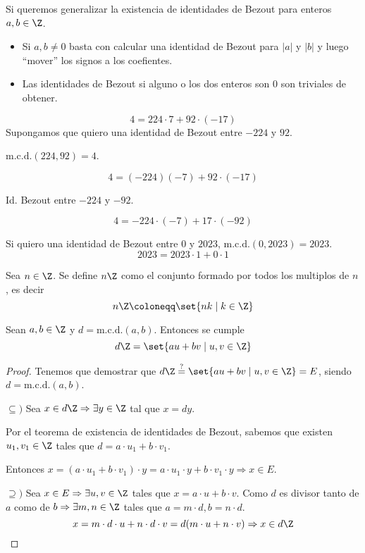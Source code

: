 \begin{remark}
	Si queremos generalizar la existencia de identidades de Bezout para enteros \(a,b \in \Z \).
	\begin{itemize}
		\item Si \(a,b \neq 0 \) basta con calcular una identidad de Bezout para \(|a| \) y \(|b| \) y luego ``mover'' los signos a los coefientes.
		\item Las identidades de Bezout si alguno o los dos enteros son 0 son triviales de obtener.
	\end{itemize}
\end{remark}

\begin{example}
	\[
		4 = 224 \cdot 7 + 92 \cdot (-17 )
	\]
	Supongamos que quiero una identidad de Bezout entre \(-224 \) y \(92 \).

	\(\mathrm{m.c.d.}(224,92) = 4  \).

	\[
		4 = (-224)(-7) + 92 \cdot (-17)
	\]

	Id. Bezout entre \(-224 \) y \(-92\).

	\[4 = -224 \cdot (-7) + 17 \cdot (-92)\]


	Si quiero una identidad de Bezout entre \(0 \) y \(2023 \), \(\mathrm{m.c.d.}(0,2023) = 2023 \).
	\[
		2023 = 2023 \cdot 1 + 0 \cdot 1
	\]
\end{example}

Sea \(n \in \Z \). Se define \(n\Z \) como el conjunto formado por todos los multiplos de \(n \), es decir
\[
	n\Z \coloneqq \set{nk \mid k \in \Z }
\]

\begin{theorem}
	Sean \(a,b \in \Z \) y \(d = \mathrm{m.c.d.}(a,b) \). Entonces se cumple
	\[
		d\Z =\set{au + bv \mid u,v \in  \Z }
	\]
\end{theorem}
\begin{proof}
	Tenemos que demostrar que \(d\Z \overset{?}{=} \set{au + bv \mid u,v \in \Z } = E\), siendo \(d = \mathrm{m.c.d.}(a,b) \).

	\(\subseteq ) \) Sea \(x \in d\Z \Rightarrow \exists y \in \Z\) tal que \(x = dy \).

	Por el teorema de existencia de identidades de Bezout, sabemos que existen \(u_1, v_1 \in \Z \) tales que \(d = a \cdot u_1 + b \cdot v_1\).

	Entonces \(x = (a \cdot u_1 + b \cdot v_1) \cdot y = a \cdot u_1 \cdot y + b \cdot v_1 \cdot y \Rightarrow x \in E\).

	\(\supseteq )\) Sea \(x \in E \Rightarrow \exists u,v \in \Z \) tales que \(x = a \cdot u + b \cdot v\). Como \(d \) es divisor tanto de \(a  \) como de \(b \Rightarrow \exists m,n \in \Z \) tales que \(a = m \cdot d, b = n \cdot d \).
	\[
		x = m \cdot d \cdot u + n \cdot d \cdot v = d (m \cdot u + n \cdot v ) \Rightarrow x \in d\Z
	\]
\end{proof}

